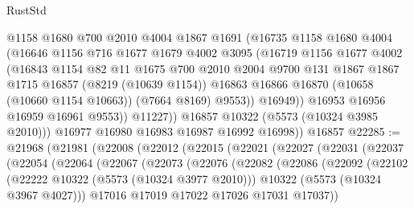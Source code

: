 \begin{lexlean}{RustStd}
\begin{coremodule}
                  @1158
                  @1680
                  @700
                  @2010
                  @4004
                  @1867
                  @1691
                  (@16735
                    @1158
                    @1680
                    @4004
                    (@16646
                      @1156
                      @716
                      @1677
                      @1679
                      @4002
                      @3095
                      (@16719
                        @1156
                        @1677
                        @4002
                        (@16843
                          @1154
                          @82
                          @11
                          @1675
                          @700
                          @2010
                          @2004
                          @9700
                          @131
                          @1867
                          @1867
                          @1715
                          @16857
                          (@8219 (@10639 @1154))
                          @16863
                          @16866
                          @16870
                          (@10658 (@10660 @1154 @10663))
                          (@7664 @8169)
                          @9553))
                      @16949))
                  @16953
                  @16956
                  @16959
                  @16961
                  @9553))
              @11227))
          @16857
          @10322
          (@5573 (@10324 @3985 @2010)))
        @16977
        @16980
        @16983
        @16987
        @16992
        @16998))
    @16857
@22285 := @21968
    (@21981
      (@22008
        (@22012
          (@22015
            (@22021
              (@22027
                (@22031
                  (@22037
                    (@22054
                      (@22064
                        (@22067
                          (@22073
                            (@22076
                              (@22082
                                (@22086
                                  (@22092
                                    (@22102
                                      (@22222 @10322 (@5573 (@10324 @3977 @2010)))
                                      @10322
                                      (@5573 (@10324 @3967 @4027)))
                                    @17016
                                    @17019
                                    @17022
                                    @17026
                                    @17031
                                    @17037))

\end{coremodule}
\end{lexlean}
